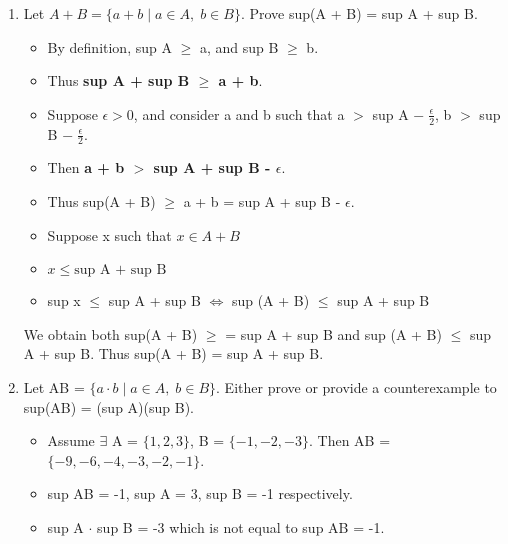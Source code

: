 \documentclass[12pt]{article}
\begin{document}
\begin{enumerate}[label=(\alph*)]
    \item Let $A + B = \{a+b \;|\; a \in A, \;b \in B \}.$ Prove sup(A + B) = sup A + sup B.
        \begin{itemize}
            \item By definition, sup A $\ge$ a, and sup B $\ge$ b.
            \item Thus \textbf{sup A + sup B $\ge$ a + b}.
            \item Suppose $\epsilon > 0$, and consider a and b such that a $>$ sup A $- \;\frac{\epsilon}{2}$, b $>$ sup B $-\; \frac{\epsilon}{2}$.
            \item Then \textbf{a + b $>$ sup A + sup B - $\epsilon$}.
            \item Thus sup(A + B) $\ge$ a + b = sup A + sup B - $\epsilon$.\\
            \item Suppose x such that $x \in A + B$
            \item $x \le \text{sup A + sup B}$
            \item sup x $\le$ sup A + sup B $\Leftrightarrow$ sup (A + B) $\le$ sup A + sup B
        \end{itemize}
        We obtain both sup(A + B) $\ge$ = sup A + sup B and sup (A + B) $\le$ sup A + sup B. Thus sup(A + B) = sup A + sup B. 
    \item Let AB = $\{a\cdot b \;|\; a \in A, \;b \in B \}.$ Either prove or provide a counterexample to sup(AB) = (sup A)(sup B).
        \begin{itemize}
            \item Assume $\exists$ A = $\{1,2,3\}$, B = $\{-1,-2,-3\}$. Then AB = $\{-9,-6,-4,-3,-2,-1\}$.
            \item sup AB = -1, sup A = 3, sup B = -1 respectively.
            \item sup A $\cdot$ sup B = -3 which is not equal to sup AB = -1.
        \end{itemize}
\end{enumerate}
\end{document}
